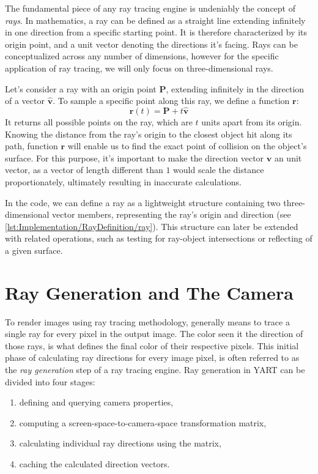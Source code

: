 The fundamental piece of any ray tracing engine is undeniably the concept of \textit{rays}.
In mathematics, a ray can be defined as a straight line extending infinitely in one direction from a specific starting point. 
It is therefore characterized by its origin point, and a unit vector denoting the directions it's facing.
Rays can be conceptualized across any number of dimensions, however for the specific application of ray tracing, we will only focus on three-dimensional rays.

Let's consider a ray with an origin point $ \bm{P} $, extending infinitely in the direction of a vector $ \bm{\hat{v}} $.
To sample a specific point along this ray, we define a function $ \bm{r} $:
\begin{equation}
    \bm{r}(t) = \bm{P} + t\bm{\hat{v}}
\end{equation}
It returns all possible points on the ray, which are $ t $ units apart from its origin.
Knowing the distance from the ray's origin to the closest object hit along its path, function $ \bm{r} $ will enable us to find the exact point of collision on the object's surface.
For this purpose, it's important to make the direction vector $ \bm{\hat{v}} $ an unit vector, as a vector of length different than $ 1 $ would scale the distance proportionately, ultimately resulting in inaccurate calculations. 

In the code, we can define a ray as a lightweight structure containing two three-dimensional vector members, representing the ray's origin and direction (see \cref{lst:Implementation/RayDefinition/ray}).
This structure can later be extended with related operations, such as testing for ray-object intersections or reflecting of a given surface.

\vfill

\vfill

\section{Ray Generation and The Camera}

To render images using ray tracing methodology, generally means to trace a single ray for every pixel in the output image.
The color seen it the direction of those rays, is what defines the final color of their respective pixels. 
This initial phase of calculating ray directions for every image pixel, is often referred to as the \textit{ray generation} step of a ray tracing engine.
Ray generation in YART can be divided into four stages:
\begin{enumerate}
    \item defining and querying camera properties,
    \item computing a screen-space-to-camera-space transformation matrix,
    \item calculating individual ray directions using the matrix,
    \item caching the calculated direction vectors.
\end{enumerate}

